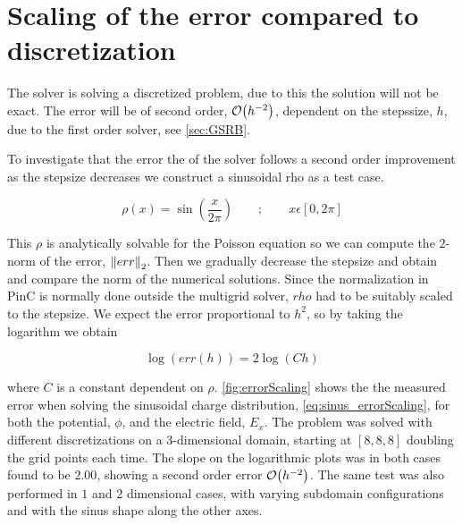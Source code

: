 \section{Scaling of the error compared to discretization}
The solver is solving a discretized problem, due to this the solution will not
be exact. The error will be of second order, \(\order{h^{-2}}\), dependent on the
stepssize, \(h\), due to the first order solver, see \cref{sec:GSRB}.


To investigate that the error the of the solver follows a second order improvement
as the stepsize decreases we construct a sinusoidal rho as a test case.

\begin{equation}
    \rho(x) = \sin{\left(\frac{x}{2\pi}\right)}      \qquad ; \qquad x\epsilon[0,2\pi] \label{eq:sinus_errorScaling}
\end{equation}

This \(\rho\) is analytically solvable for the Poisson equation so we can compute the
\(2\)-norm of the error, \(\norm{err}_2\). Then we gradually decrease the stepsize
and obtain and compare the norm of the numerical solutions. Since the normalization in PinC
is normally done outside the multigrid solver, \(rho\) had to be suitably scaled
to the stepsize. We expect the error proportional to \(h^2\), so by taking the logarithm
we obtain

\begin{equation}
    \log(err(h)) = 2\log(Ch)
\end{equation}

where \(C\) is a constant dependent on \(\rho\). \cref{fig:errorScaling} shows the
the measured error when solving the sinusoidal charge distribution, \cref{eq:sinus_errorScaling},
for both the potential, \(\phi\), and the electric field, \(E_x\).
The problem was solved with different discretizations on a \(3\)-dimensional domain,
starting at \([8,8,8]\) doubling the grid points each time. The slope on the logarithmic plots
was in both cases found to be \(2.00\), showing a second order error \(\order{h^{-2}}\).
The same test was also performed in \(1\) and \(2\) dimensional cases, with varying
subdomain configurations and with the sinus shape along the other axes.


